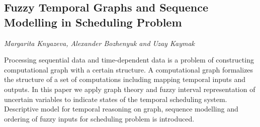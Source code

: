 \documentclass[../booklet.tex]{subfiles}
\begin{document}
\subsection[Fuzzy Temporal Graphs and Sequence Modelling in  Scheduling Problem. {\it Margarita Knyazeva, Alexander Bozhenyuk and Uzay Kaymak}]{Fuzzy Temporal Graphs and Sequence Modelling in  Scheduling Problem}
  

\begin{center}
  {\it Margarita Knyazeva, Alexander Bozhenyuk and Uzay Kaymak}
\end{center}

\vskip 0.8cm

Processing sequential data and time-dependent data is a problem of constructing computational graph with a certain structure. A computational graph formalizes the structure of a set of computations including mapping temporal inputs and outputs. In this paper we apply graph theory and fuzzy interval representation of uncertain variables to indicate states of the temporal scheduling system. Descriptive model for temporal reasoning on graph, sequence modelling and ordering of fuzzy inputs for scheduling problem is introduced.

\end{document}
